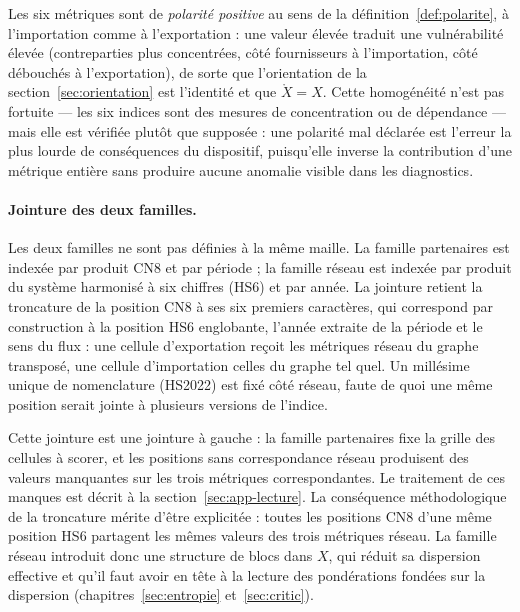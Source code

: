 \documentclass[11pt,a4paper]{article}
\theoremstyle{definition}
\theoremstyle{remark}
\newcommand{\Xor}{\mathring{X}}
\begin{document}
\bigskip

Les six métriques sont de \emph{polarité positive} au sens de la
définition~\ref{def:polarite}, à l'importation comme à l'exportation : une valeur élevée
traduit une vulnérabilité élevée (contreparties plus concentrées, côté fournisseurs à
l'importation, côté débouchés à l'exportation), de sorte que l'orientation de la
section~\ref{sec:orientation} est l'identité et que $\Xor = X$. Cette homogénéité n'est
pas fortuite --- les six indices sont des mesures de concentration ou de dépendance ---
mais elle est vérifiée plutôt que supposée : une
polarité mal déclarée est l'erreur la plus lourde de conséquences du dispositif, puisqu'elle
inverse la contribution d'une métrique entière sans produire aucune anomalie visible dans
les diagnostics.

\bigskip

\paragraph{Jointure des deux familles.} Les deux familles ne sont pas définies à la même
maille. La famille partenaires est indexée par produit CN8 et par période ; la famille
réseau est indexée par produit du système harmonisé à six chiffres (HS6) et par année. La
jointure retient la troncature de la position CN8 à ses six premiers caractères, qui
correspond par construction à la position HS6 englobante, l'année extraite de la période
et le sens du flux : une cellule d'exportation reçoit les métriques réseau du graphe
transposé, une cellule d'importation celles du graphe tel quel. Un millésime unique de
nomenclature (HS2022) est fixé côté réseau, faute de quoi une même position serait jointe à
plusieurs versions de l'indice.

\medskip

Cette jointure est une jointure à gauche : la famille partenaires fixe la grille des
cellules à scorer, et les positions sans correspondance réseau produisent des valeurs
manquantes sur les trois métriques correspondantes. Le traitement de ces manques est décrit
à la section~\ref{sec:app-lecture}. La conséquence méthodologique de la troncature mérite
d'être explicitée : toutes les positions CN8 d'une même position HS6 partagent les mêmes
valeurs des trois métriques réseau. La famille réseau introduit donc une structure de blocs
dans $X$, qui réduit sa dispersion effective et qu'il faut avoir en tête à la lecture des
pondérations fondées sur la dispersion (chapitres~\ref{sec:entropie}
et~\ref{sec:critic}).
\end{document}
